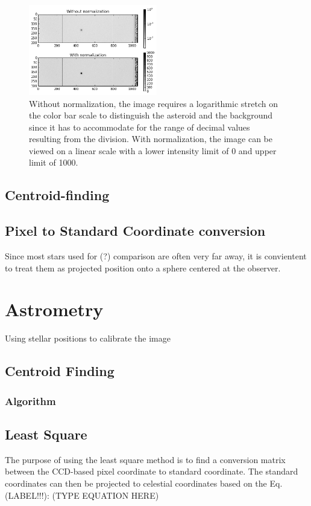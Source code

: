 \documentclass[authoryear, 12pt,5p, times]{elsarticle}
\begin{document}
	\begin{figure}[h!]
\includegraphics[width=0.5\textwidth]{figures/normalization}
\caption{Without normalization, the image requires a logarithmic stretch on the color bar scale to distinguish the asteroid and the background since it has to accommodate for the range of decimal values resulting from the division. With normalization, the image can be viewed on a linear scale with a lower intensity limit of 0 and upper limit of 1000.}
\label{normalization}
\end{figure}

\subsection{Centroid-finding}
\subsection{Pixel to Standard Coordinate conversion}
Since most stars used for (?) comparison are often very far away, it is convientent to treat them as projected position onto a sphere centered at the observer.
\section{Astrometry}
Using stellar positions to calibrate the image
	\subsection{Centroid Finding}
		\subsubsection{Algorithm}
	\subsection{Least Square}
	The purpose of using the least square method is to find a conversion matrix between the CCD-based pixel coordinate to standard coordinate.
	The standard coordinates can then be projected to celestial coordinates based on the Eq. (LABEL!!!):
	(TYPE EQUATION HERE)
	
\end{document}
